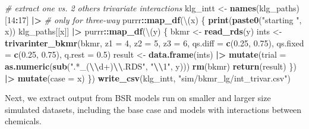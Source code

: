 \documentclass[12pt, twoside]{amherstthesis}
\newenvironment{Shaded}{\begin{snugshade}}{\end{snugshade}}
\newcommand{\AttributeTok}[1]{\textcolor[rgb]{0.13,0.29,0.53}{#1}}
\newcommand{\CommentTok}[1]{\textcolor[rgb]{0.56,0.35,0.01}{\textit{#1}}}
\newcommand{\DecValTok}[1]{\textcolor[rgb]{0.00,0.00,0.81}{#1}}
\newcommand{\FloatTok}[1]{\textcolor[rgb]{0.00,0.00,0.81}{#1}}
\newcommand{\FunctionTok}[1]{\textcolor[rgb]{0.13,0.29,0.53}{\textbf{#1}}}
\newcommand{\NormalTok}[1]{#1}
\newcommand{\OtherTok}[1]{\textcolor[rgb]{0.56,0.35,0.01}{#1}}
\newcommand{\SpecialCharTok}[1]{\textcolor[rgb]{0.81,0.36,0.00}{\textbf{#1}}}
\newcommand{\StringTok}[1]{\textcolor[rgb]{0.31,0.60,0.02}{#1}}
\begin{document}
\begin{Shaded}
\begin{Highlighting}[]
\CommentTok{\# extract one vs. 2 others trivariate interactions}
\NormalTok{klg\_intt }\OtherTok{\textless{}{-}} \FunctionTok{names}\NormalTok{(klg\_paths)[}\DecValTok{14}\SpecialCharTok{:}\DecValTok{17}\NormalTok{] }\SpecialCharTok{|\textgreater{}} \CommentTok{\# only for three{-}way}
\NormalTok{  purrr}\SpecialCharTok{::}\FunctionTok{map\_df}\NormalTok{(\textbackslash{}(x) \{}
    \FunctionTok{print}\NormalTok{(}\FunctionTok{paste0}\NormalTok{(}\StringTok{"starting "}\NormalTok{, x))}
\NormalTok{    klg\_paths[[x]] }\SpecialCharTok{|\textgreater{}} 
\NormalTok{      purrr}\SpecialCharTok{::}\FunctionTok{map\_df}\NormalTok{(\textbackslash{}(y) \{}
\NormalTok{        bkmr }\OtherTok{\textless{}{-}} \FunctionTok{read\_rds}\NormalTok{(y)}
\NormalTok{        ints }\OtherTok{\textless{}{-}} \FunctionTok{trivarinter\_bkmr}\NormalTok{(bkmr, }
                                 \AttributeTok{z1 =} \DecValTok{4}\NormalTok{, }\AttributeTok{z2 =} \DecValTok{5}\NormalTok{, }\AttributeTok{z3 =} \DecValTok{6}\NormalTok{,}
                                 \AttributeTok{qs.diff =} \FunctionTok{c}\NormalTok{(}\FloatTok{0.25}\NormalTok{, }\FloatTok{0.75}\NormalTok{), }
                                 \AttributeTok{qs.fixed =} \FunctionTok{c}\NormalTok{(}\FloatTok{0.25}\NormalTok{, }\FloatTok{0.75}\NormalTok{),}
                                 \AttributeTok{q.rest =} \FloatTok{0.5}\NormalTok{)}
\NormalTok{        result }\OtherTok{\textless{}{-}} \FunctionTok{data.frame}\NormalTok{(ints) }\SpecialCharTok{|\textgreater{}} 
          \FunctionTok{mutate}\NormalTok{(}\AttributeTok{trial =} \FunctionTok{as.numeric}\NormalTok{(}\FunctionTok{sub}\NormalTok{(}\StringTok{".*\_(}\SpecialCharTok{\textbackslash{}\textbackslash{}}\StringTok{d+)}\SpecialCharTok{\textbackslash{}\textbackslash{}}\StringTok{.RDS"}\NormalTok{, }\StringTok{"}\SpecialCharTok{\textbackslash{}\textbackslash{}}\StringTok{1"}\NormalTok{, y)))}
        \FunctionTok{rm}\NormalTok{(bkmr)}
        \FunctionTok{return}\NormalTok{(result)}
\NormalTok{      \}) }\SpecialCharTok{|\textgreater{}} 
      \FunctionTok{mutate}\NormalTok{(}\AttributeTok{case =}\NormalTok{ x)}
\NormalTok{  \})}
\FunctionTok{write\_csv}\NormalTok{(klg\_intt, }\StringTok{"sim/bkmr\_lg/int\_trivar.csv"}\NormalTok{)}
\end{Highlighting}
\end{Shaded}
\normalsize

Next, we extract output from BSR models run on smaller and larger size simulated datasets, including the base case and models with interactions between chemicals.
\end{document}
